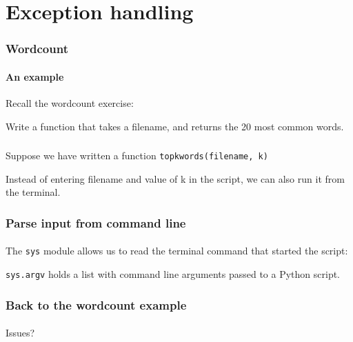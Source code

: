 \section{Exception handling} %
\label{sec:exception_handling}


\begin{frame}\frametitle{Wordcount}
    \framesubtitle{An example}

    Recall the wordcount exercise:

    \vfill

    Write a function that takes a filename, and returns the 20 most common words.

\end{frame}

\begin{frame}\frametitle{}
    \framesubtitle{}

    Suppose we have written a function \texttt{topkwords(filename, k)}

    \vfill

    Instead of entering filename and value of k in the script, we can also run it
    from the terminal.

\end{frame}

\begin{frame}\frametitle{Parse input from command line}
    \framesubtitle{}

    The \texttt{sys} module allows us to read the terminal command that
    started the script:


    \pause\vfill

    \texttt{sys.argv} holds a list with command line arguments passed to a
    Python script.

\end{frame}

\begin{frame}\frametitle{Back to the wordcount example}
    \framesubtitle{}


    \pause

    Issues?

\end{frame}

